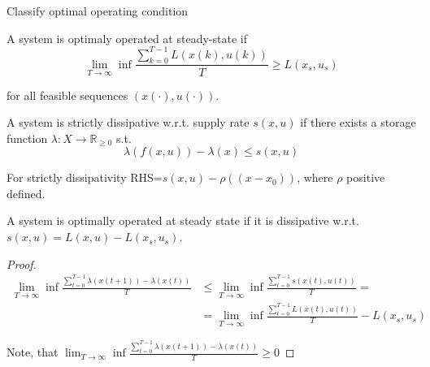Classify optimal operating condition

\begin{Definition}
 A system is optimaly operated at steady-state if
 $$\lim_{T\rightarrow\infty}\inf\frac{\sum_{k=0}^{T-1}L(x(k),u(k))}{T} \ge L(x_s,u_s)$$

 for all feasible sequences $(x(\cdot), u(\cdot))$.
\end{Definition}

\begin{Definition}
 A system is strictly dissipative w.r.t. supply rate $s(x,u)$ if there exists a storage 
 function $\lambda:X\rightarrow\mathbb{R}_{\ge 0}$ s.t.
 $$\lambda(f(x,u))-\lambda(x)\le s(x,u)$$

 For strictly dissipativity RHS=$s(x,u)-\rho((x-x_0))$, where $\rho$ positive defined.
\end{Definition}

\begin{Theorem}
 A system is optimally operated at steady state if it is dissipative w.r.t.
 $s(x,u)=L(x,u)-L(x_s,u_s)$.
 \begin{proof}
  \begin{equation}
   \begin{split}
    \lim_{T\rightarrow\infty}\inf\frac{\sum_{t=0}^{T-1}\lambda(x(t+1))-\lambda(x(t))}{T} &\le
           \lim_{T\rightarrow\infty}\inf\frac{\sum_{t=0}^{T-1}s(x(t),u(t))}{T}= \\
           &=\lim_{T\rightarrow\infty}\inf\frac{\sum_{t=0}^{T-1}L(x(t),u(t))}{T}-L(x_s,u_s)
   \end{split}
  \end{equation}

  Note, that $\lim_{T\rightarrow\infty}\inf\frac{\sum_{t=0}^{T-1}\lambda(x(t+1))-\lambda(x(t))}{T} \ge 0$
 \end{proof}
\end{Theorem}


